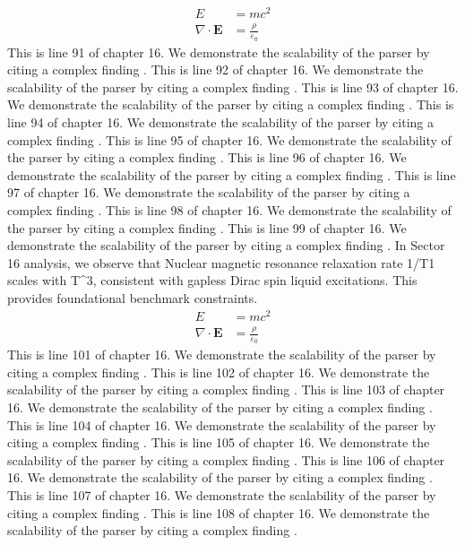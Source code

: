 \begin{align*}
  E &= mc^2 \\
  \nabla \cdot \mathbf{E} &= \frac{\rho}{\varepsilon_0}
\end{align*}
This is line 91 of chapter 16. We demonstrate the scalability of the parser by citing a complex finding \cite{ref16_91}.
This is line 92 of chapter 16. We demonstrate the scalability of the parser by citing a complex finding \cite{ref16_92}.
This is line 93 of chapter 16. We demonstrate the scalability of the parser by citing a complex finding \cite{ref16_93}.
This is line 94 of chapter 16. We demonstrate the scalability of the parser by citing a complex finding \cite{ref16_94}.
This is line 95 of chapter 16. We demonstrate the scalability of the parser by citing a complex finding \cite{ref16_95}.
This is line 96 of chapter 16. We demonstrate the scalability of the parser by citing a complex finding \cite{ref16_96}.
This is line 97 of chapter 16. We demonstrate the scalability of the parser by citing a complex finding \cite{ref16_97}.
This is line 98 of chapter 16. We demonstrate the scalability of the parser by citing a complex finding \cite{ref16_98}.
This is line 99 of chapter 16. We demonstrate the scalability of the parser by citing a complex finding \cite{ref16_99}.
In Sector 16 analysis, we observe that Nuclear magnetic resonance relaxation rate 1/T1 scales with T^3, consistent with gapless Dirac spin liquid excitations. This provides foundational benchmark constraints.
\begin{align*}
  E &= mc^2 \\
  \nabla \cdot \mathbf{E} &= \frac{\rho}{\varepsilon_0}
\end{align*}
This is line 101 of chapter 16. We demonstrate the scalability of the parser by citing a complex finding \cite{ref16_101}.
This is line 102 of chapter 16. We demonstrate the scalability of the parser by citing a complex finding \cite{ref16_102}.
This is line 103 of chapter 16. We demonstrate the scalability of the parser by citing a complex finding \cite{ref16_103}.
This is line 104 of chapter 16. We demonstrate the scalability of the parser by citing a complex finding \cite{ref16_104}.
This is line 105 of chapter 16. We demonstrate the scalability of the parser by citing a complex finding \cite{ref16_105}.
This is line 106 of chapter 16. We demonstrate the scalability of the parser by citing a complex finding \cite{ref16_106}.
This is line 107 of chapter 16. We demonstrate the scalability of the parser by citing a complex finding \cite{ref16_107}.
This is line 108 of chapter 16. We demonstrate the scalability of the parser by citing a complex finding \cite{ref16_108}.
